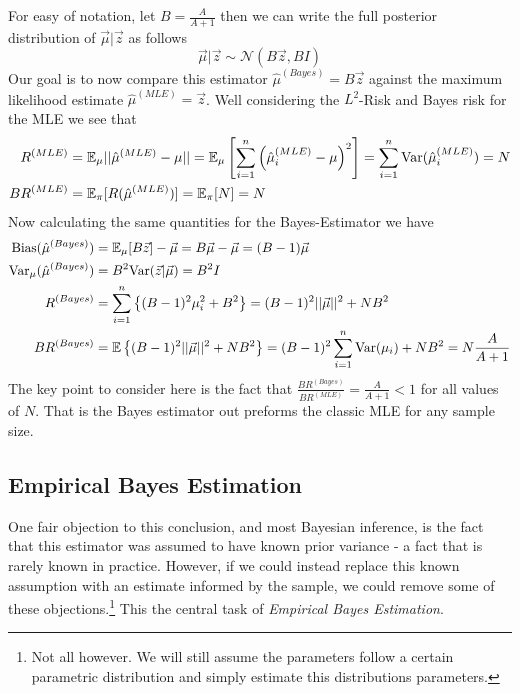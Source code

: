 \documentclass[11pt]{article}
\begin{document}
For easy of notation, let $B = \frac{A}{A+1}$ then we can write the full posterior distribution of $\vec{\mu}|\vec{z}$ as follows 
\begin{equation}
\vec{\mu}|\vec{z}\sim\mathcal{N}(B\vec{z}, BI)
\end{equation}
Our goal is to now compare this estimator $\hat{\mu}^{(Bayes)} = B\vec{z}$ against the maximum likelihood estimate $\hat{\mu}^{(MLE)} = \vec{z}$. Well considering the $L^2$-Risk and Bayes risk for the MLE we see that 
\begin{align*} 
R^{(MLE)} &= {\mathbb{E}}_{\mu}||\hat{\mu}^{(MLE)} - \mu|| = {\mathbb{E}}_{\mu}\left[\sum_{i=1}^n\left(\hat{\mu}_i^{(MLE)} - \mu\right)^2\right]= \sum_{i=1}^n{\text{Var}}(\hat{\mu}_i^{(MLE)}) = N\\
BR^{(MLE)} &= {\mathbb{E}}_{\pi}[R(\hat{\mu}^{(MLE)})] = {\mathbb{E}}_{\pi}[N] = N\\
\end{align*}
Now calculating the same quantities for the Bayes-Estimator we have 
\begin{align*}
\text{Bias}(\hat{\mu}^{(Bayes)}) &= {\mathbb{E}}_{\mu}[B\vec{z}] - \vec{\mu} = B\vec{\mu} - \vec{\mu} = (B-1)\vec{\mu}\\
{\text{Var}}_{\mu}(\hat{\mu}^{(Bayes)}) &= B^2{\text{Var}}(\vec{z}|\vec{\mu}) = B^2I\\
R^{(Bayes)} &= \sum_{i=1}^n\left\{(B-1)^2\mu_i^2 + B^2\right\} = (B-1)^2||\vec{\mu}||^2 + NB^2\\
BR^{(Bayes)} &= {\mathbb{E}}\left\{(B-1)^2||\vec{\mu}||^2 + NB^2\right\} = (B-1)^2\sum_{i=1}^n{\text{Var}}(\mu_i) + NB^2 = N\frac{A}{A+1}
\end{align*}
The key point to consider here is the fact that $\frac{BR^{(Bayes)}}{BR^{(MLE)}} = \frac{A}{A+1}<1$ for all values of $N$. That is the Bayes estimator out preforms the classic MLE for any sample size.

\subsection{Empirical Bayes Estimation}
 One fair objection to this conclusion, and most Bayesian inference, is the fact that this estimator was assumed to have known  prior variance - a fact that is rarely known in practice. However, if we could instead replace this known assumption with an estimate informed by the sample, we could remove some of these objections.\footnote{Not all however. We will still assume the parameters follow a certain parametric distribution and simply estimate this distributions parameters.} This the central task of \textit{Empirical Bayes Estimation}. 
\end{document}

